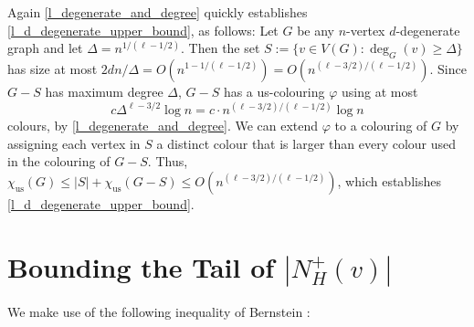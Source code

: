 \documentclass{patmorin}
\newcommand{\trn}{\chi_{\mathrm{us}}}
\begin{document}
Again \cref{l_degenerate_and_degree} quickly establishes \cref{l_d_degenerate_upper_bound}, as follows:  Let $G$ be any $n$-vertex $d$-degenerate graph and let $\Delta=n^{1/(\ell-1/2)}$.  Then the set $S:=\{v\in V(G):\deg_G(v)\ge \Delta\}$ has size at most $2dn/\Delta=O(n^{1-1/(\ell-1/2)})=O(n^{(\ell-3/2)/(\ell-1/2)})$.  Since $G-S$ has maximum degree $\Delta$, $G-S$ has a us-colouring $\varphi$ using at most
\[
  c\Delta^{\ell-3/2}\log n
  = c\cdot n^{(\ell-3/2)/(\ell-1/2)}\log n
\]
 colours, by \cref{l_degenerate_and_degree}. We can extend $\varphi$ to a colouring of $G$ by assigning each vertex in $S$ a distinct colour that is larger than every colour used in the colouring of $G-S$.  Thus, $\trn(G)\le |S|+\trn(G-S)\le O(n^{(\ell-3/2)/(\ell-1/2)})$, which establishes \cref{l_d_degenerate_upper_bound}.





\appendix

\section{Bounding the Tail of \boldmath$|N_H^+(v)|$}

We make use of the following inequality of Bernstein \cite[Corollary~2.11]{boucheron.lugosi.ea:concentration}:
\end{document}
